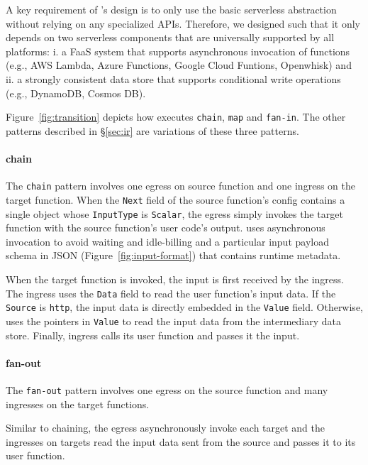 A key requirement of \deorc's design is to only use the basic serverless
abstraction without relying on any specialized APIs. Therefore, we designed
\deorc{} such that it only depends on two serverless components that are
universally supported by all platforms: i. a FaaS system that supports
asynchronous invocation of functions (e.g., AWS Lambda, Azure Functions,
Google Cloud Funtions, Openwhisk) and ii. a strongly consistent data store
that supports conditional write operations (e.g., DynamoDB, Cosmos DB).

Figure~\ref{fig:transition} depicts how \deorc{} executes \texttt{chain},
\texttt{map} and \texttt{fan-in}. The other patterns described in
\S\ref{sec:ir} are variations of these three patterns.

\paragraph{chain} 

The \texttt{chain} pattern involves one egress on source function and one
ingress on the target function. When the \texttt{Next} field of the source
function's \name{} config contains a single object whose \texttt{InputType} is
\texttt{Scalar}, the \deorc{} egress simply invokes the target function with
the source function's user code's output. \deorc{} uses asynchronous
invocation to avoid waiting and idle-billing and a particular input payload
schema in JSON (Figure~\ref{fig:input-format}) that contains \name{} runtime
metadata.

When the target function is invoked, the input is first received by the \deorc{}
ingress. The ingress uses the \texttt{Data} field to read the user function's
input data. If the \texttt{Source} is \texttt{http}, the input data is
directly embedded in the \texttt{Value} field. Otherwise,
\name{} uses the pointers in \texttt{Value} to read the input data from the
intermediary data store. Finally, ingress calls its user function and passes
it the input.

\paragraph{fan-out}

The \texttt{fan-out} pattern involves one egress on the source function and
many ingresses on the target functions.

Similar to chaining, the egress asynchronously invoke each target and the
ingresses on targets read the input data sent from the source and passes it to
its user function.

